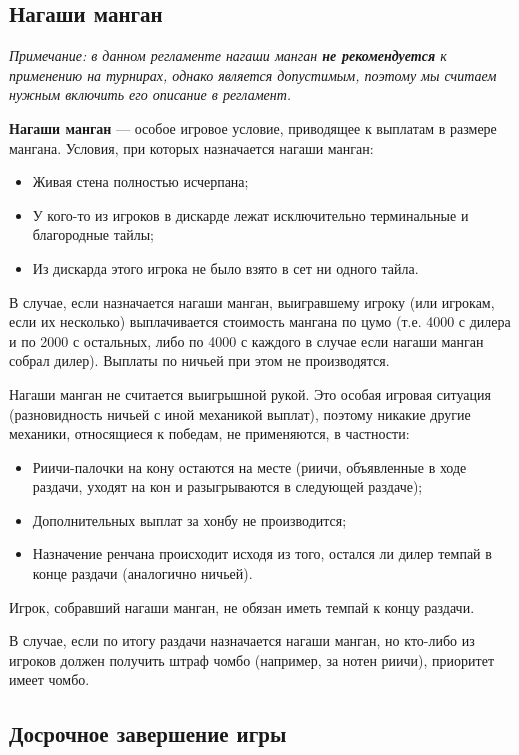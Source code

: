 \subsection{Нагаши манган}

\textit{Примечание: в данном регламенте нагаши манган \textbf{не рекомендуется} к применению на турнирах, однако является допустимым, поэтому мы считаем нужным включить его описание в регламент.}

\textbf{Нагаши манган} --- особое игровое условие, приводящее к выплатам в размере мангана. Условия, при которых назначается нагаши манган:

\begin{itemize}
	\item Живая стена полностью исчерпана;
	\item У кого-то из игроков в дискарде лежат исключительно терминальные и благородные тайлы;
	\item Из дискарда этого игрока не было взято в сет ни одного тайла.
\end{itemize}

В случае, если назначается нагаши манган, выигравшему игроку (или игрокам, если их несколько) выплачивается стоимость мангана по цумо (т.е. 4000 с дилера и по 2000 с остальных, либо по 4000 с каждого в случае если нагаши манган собрал дилер). Выплаты по ничьей при этом не производятся.

Нагаши манган не считается выигрышной рукой. Это особая игровая ситуация (разновидность ничьей с иной механикой выплат), поэтому никакие другие механики, относящиеся к победам, не применяются, в частности:

\begin{itemize}
	\item Риичи-палочки на кону остаются на месте (риичи, объявленные в ходе раздачи, уходят на кон и разыгрываются в следующей раздаче);
	\item Дополнительных выплат за хонбу не производится;
	\item Назначение ренчана происходит исходя из того, остался ли дилер темпай в конце раздачи (аналогично ничьей).
\end{itemize}

Игрок, собравший нагаши манган, не обязан иметь темпай к концу раздачи.

В случае, если по итогу раздачи назначается нагаши манган, но кто-либо из игроков должен получить штраф чомбо (например, за нотен риичи), приоритет имеет чомбо.

\subsection{Досрочное завершение игры}


